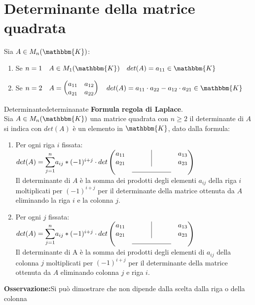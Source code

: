\documentclass[12pt, letterpaper]{report}
\newcounter{definition}
\newcommand{\nmu}{}
\begin{document}
  		\section{Determinante della matrice quadrata}
  		Sia $A \in M_n(\mathbbm{K})$:
  		\begin{enumerate}
			\item Se $n = 1 \quad A \in M_1(\mathbbm{K}) \quad det(A) = a_{11} \in \mathbbm{K}$
			\item Se $n = 2 \quad A = \begin{pmatrix}
				a_{11} & a_{12} \\
				a_{21} & a_{22}
			\end{pmatrix} \quad det(A) = a_{11} \cdot a_{22} - a_{12} \cdot a_{21} \in \mathbbm{K}$
  		\end{enumerate}
  		 \begin{definition}{\nmu Determinante}{determinanate}
  		 	\textbf{Formula regola di Laplace}. \\
  		 	Sia $A \in M_n(\mathbbm{K})$ una matrice quadrata con $n \geq 2$ il determinante di $A$ si indica con $det(A)$ è un elemento in $\mathbbm{K}$, dato dalla formula:
  		 	\begin{enumerate}
  		 		\item Per ogni riga $i$ fissata: \\
  		 		$det(A) = \mathlarger{\sum_{j = 1}^{n}}a_{ij}*(-1)^{i+j} \cdot det\begin{pmatrix}
  		 		a_{11}	& \vline & a_{13}\\
  		 		a_{21}	& \vline & a_{23}\\
  		 		& \rule{2cm}{0.4pt}&
  		 		\end{pmatrix}$ \\
  		 		Il determinante di $A$ è la somma dei prodotti degli elementi $a_{ij}$ della riga $i$ moltiplicati per $(-1)^{i + j}$ per il determinante della matrice ottenuta da $A$ eliminando la riga $i$ e la colonna $j$.
  		 		\item Per ogni $j$ fissata: \\
  		 		$det(A) = \mathlarger{\sum_{j = 1}^{n}}a_{ij}*(-1)^{i+j} \cdot det\begin{pmatrix}
  		 			a_{11}	& \vline & a_{13}\\
  		 			a_{21}	& \vline & a_{23}\\
  		 			& \rule{2cm}{0.4pt}&
  		 		\end{pmatrix}$ \\
  		 		Il determinante di A è la somma dei prodotti degli elementi di $a_{ij}$ della colonna $j$ moltiplicati per $(-1)^{i + j}$ per il determinante della matrice ottenuta da $A$ eliminando colonna $j$ e riga $i$.
  		 	\end{enumerate}
  		 	\textbf{Osservazione:}Si può dimostrare che non dipende dalla scelta dalla riga o della colonna
  		 \end{definition}
\end{document}
